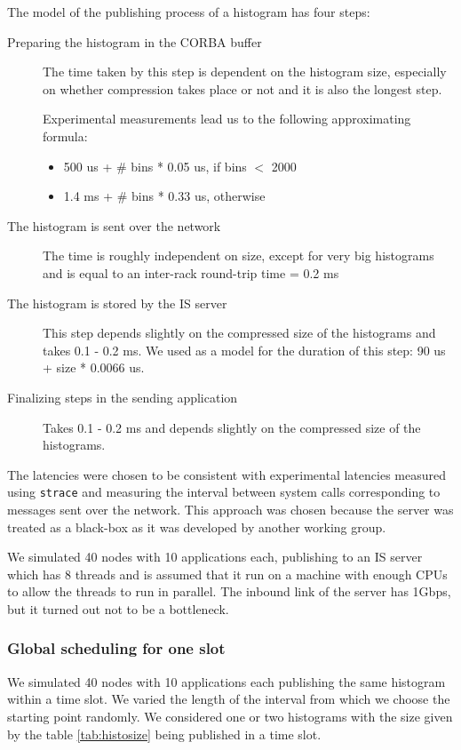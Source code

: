 The model of the publishing process of a histogram has four steps: 
\begin{description}
\item [Preparing the histogram in the CORBA buffer]
The time taken by this step is dependent on the histogram size, especially on whether compression takes place or not and it is also the longest step.

Experimental measurements lead us to the following approximating formula:
\begin{itemize}
\item 500 us + \# bins * 0.05 us, if bins $<$ 2000
\item 1.4 ms + \# bins * 0.33 us, otherwise 
\end{itemize}
\item[The histogram is sent over the network]
The time is roughly independent on size, except for very big histograms and is equal to an inter-rack round-trip time = 0.2 ms
\item[The histogram is stored by the IS server]
This step depends slightly on the compressed size of the histograms and takes 0.1 - 0.2 ms. We used as a model for the duration of this step: 90 us + size * 0.0066 us.
\item[Finalizing steps in the sending application]
Takes 0.1 - 0.2 ms and depends slightly on the compressed size of the histograms.
\end{description}

The latencies were chosen to be consistent with experimental latencies measured using {\tt strace} and measuring the interval between system calls corresponding to messages sent over the network. This approach was chosen because the server was treated as a black-box as it was developed by another working group. 

We simulated 40 nodes with 10 applications each, publishing to an IS server which has 8 threads and is assumed that it run on a machine with enough CPUs to allow the threads to run in parallel. The inbound link of the server has 1Gbps, but it turned out not to be a bottleneck.

\subsubsection*{Global scheduling for one slot}

We simulated 40 nodes with 10 applications each publishing the same histogram within a time slot. We varied the length of the interval from which we choose the starting point randomly. We considered one or two histograms with the size given by the table \ref{tab:histosize} being published in a time slot.

